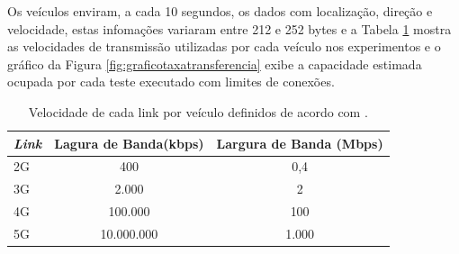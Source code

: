\documentclass[
	12pt,				%
	oneside,			%
	a4paper,			%
	english,			%
	brazil				%
	]{abntex2ppgsi}
\begin{document}
Os veículos enviram, a cada 10 segundos, os dados com localização, direção e velocidade, estas infomações variaram entre 212 e 252 bytes e a Tabela \ref{tbLink} mostra as velocidades de transmissão utilizadas por cada veículo nos experimentos e o gráfico da Figura \ref{fig:graficotaxatransferencia} exibe a capacidade estimada ocupada por cada teste executado com limites de conexões. 

\begin{table}[!h]
	\centering
	\caption{Velocidade de cada link por veículo definidos de acordo com .}
	\label{tbLink}
	\begin{tabular}{|l | c | c |}
		\hline
		\rowcolor[gray]{0.7}
		\textit{Link} & Lagura de Banda(kbps)   &    Largura de Banda  (Mbps)    \\ \hline
		\cellcolor[gray]{0.7}2G              & 400  & 0,4 \\ \hline
		\cellcolor[gray]{0.7}3G             & 2.000   & 2 \\ \hline
		\cellcolor[gray]{0.7}4G             & 100.000  & 100 \\ \hline
		\cellcolor[gray]{0.7}5G             & 10.000.000 &  1.000  \\ \hline
	\end{tabular}
\end{table}


\end{document}
